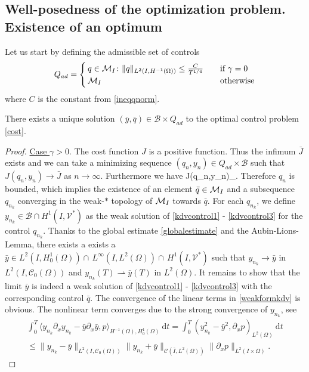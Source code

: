 \subsection{Well-posedness of the optimization problem. Existence of an optimum}
Let us start by defining the admissible set of controls
$$Q_{ad} = \begin{cases} q \in \mathcal{M}_I\colon \lVert q\rVert_{L^{2}(I,H^{-1}(\Omega))} \leq \frac{C}{T^{1/4}} &\quad\mbox{if } \gamma = 0 \\
\mathcal{M}_I & \quad \mbox{otherwise}
 \end{cases}$$
where $C$ is the constant from \eqref{ineqqnorm}.
\begin{prop}
There exists a unique solution $(\bar y,\bar q) \in \mathcal B\times Q_{ad}$ to the optimal control problem \eqref{cost}.
\end{prop}
\begin{proof}
\underline{Case $\gamma > 0$}. The cost function $J$ is a positive function. Thus the infimum $\bar J$ exists and we can take a minimizing sequence $(q_n,y_n) \in Q_{ad} \times \mathcal B$ such that $J(q_n, y_n) \rightarrow \bar J$ as $n \rightarrow \infty$. Furthermore we have
\be
J(q_n,y_n)\geq \alpha {}_{\M}.
\ee
Therefore $q_n$ is bounded, which implies the existence of an element $\bar q\in\mathcal{M}_I$ and a subsequence $q_{n_k}$ converging in the weak-$*$ topology of $\mathcal{M}_I$ towards $\bar q$. For each $q_{n_k}$, we define $y_{n_k}\in \mathcal B\cap H^1(I,\mathcal V^*)$ as the weak solution of \eqref{kdvcontrol1} - \eqref{kdvcontrol3} for the control $q_{n_k}$. Thanks to the global estimate \eqref{globalestimate} and the Aubin-Lions-Lemma, there exists a exists a $\bar y\in L^2(I,H^1_0(\Omega))\cap\,L^\infty(I,L^2(\Omega))\cap\,H^1(I,\mathcal V^*)$ such that $y_{n_k}\rightarrow\bar y$ in $L^2(I,\mathcal C_0(\Omega))$ and $y_{n_k}(T)\rightharpoonup \bar y(T)$ in $L^2(\Omega)$. It remains to show that the limit $\bar y$ is indeed a weak solution of \eqref{kdvcontrol1} - \eqref{kdvcontrol3} with the corresponding control $\bar q$. The convergence of the linear terms in \eqref{weakformkdv} is obvious. The nonlinear term converges due to the strong convergence of $y_{n_k}$, see
\begin{multline*}
\int_0^T\langle y_{n_k}\partial_xy_{n_k}-\bar y\partial_x\bar y,p\rangle_{H^{-1}(\Omega),H^1_0(\Omega)}~\mathrm dt=\int_0^T(y_{n_k}^2-\bar y^2,\partial_x p)_{L^2(\Omega)}~\mathrm dt\\
\leq\|y_{n_k}-\bar y\|_{L^2(I,\mathcal C_0(\Omega))}\|y_{n_k}+\bar y\|_{\mathcal C(\bar I,L^2(\Omega))}\|\partial_x p\|_{L^2(I\times \Omega)}.

\end{multline*}
\end{proof}
